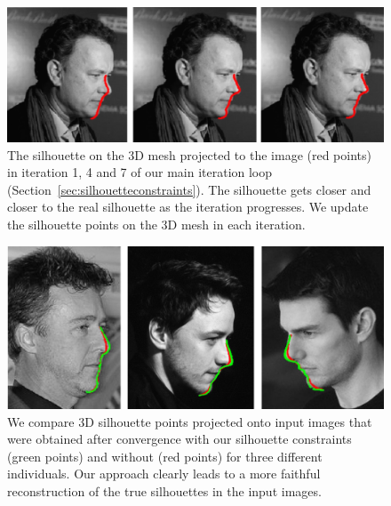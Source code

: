 \begin{figure}[t]
  \centering
  \includegraphics[width=1\linewidth]{figures/ite_th.jpg}
  \caption{\label{fig:firstExample}
           The silhouette on the 3D mesh projected to the image (red points) in iteration 1, 4 and 7 of our main iteration loop (Section~\ref{sec:silhouetteconstraints}). The silhouette gets closer and closer to the real silhouette as the iteration progresses. We update the silhouette points on the 3D mesh in each iteration.}
\end{figure}

\begin{figure}[t]
  \centering
  \includegraphics[width=1\linewidth]{figures/sil_all3.jpg}
  \caption{\label{fig:sil_all}
           We compare 3D silhouette points projected onto input images that were obtained after convergence with our silhouette constraints (green points) and without (red points) for three different individuals. Our approach clearly leads to a more faithful reconstruction of the true silhouettes in the input images.}
\end{figure}

